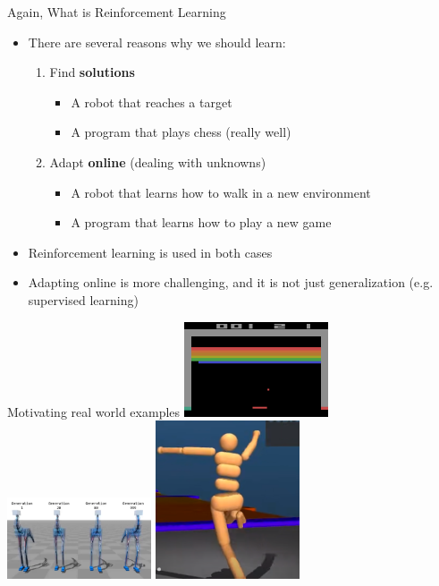 \documentclass[presentation, 9pt]{beamer}\mode<presentation>{\usetheme{AMSBolognaFC}}
\begin{document}
\begin{frame}{Again, What is Reinforcement Learning}
\begin{itemize}
	\item There are several reasons why we should learn:
	\begin{enumerate}
		\item Find \textbf{solutions}
		\begin{itemize}
			\item A robot that reaches a target
			\item A program that plays chess (really well)
		\end{itemize}
		\item Adapt \textbf{online} (dealing with unknowns)
		\begin{itemize}
			\item A robot that learns how to walk in a new environment
			\item A program that learns how to play a new game
		\end{itemize}
	\end{enumerate}
	\item Reinforcement learning is used in both cases
	\item Adapting online is more challenging, and it is not just generalization (e.g. supervised learning)
\end{itemize}

\end{frame}

\begin{frame}{Motivating real world examples}
\centering
\href{https://www.youtube.com/watch?v=V1eYniJ0Rnk}{\includegraphics[width=0.32\textwidth]{img/atari.png}}
\href{https://www.youtube.com/watch?v=43cO39XBPIA}{\includegraphics[width=0.32\textwidth]{img/robots.png}}
\href{https://www.youtube.com/watch?v=gn4nRCC9TwQ}{\includegraphics[width=0.32\textwidth]{img/ppo.png}}
\end{frame}
\end{document}
